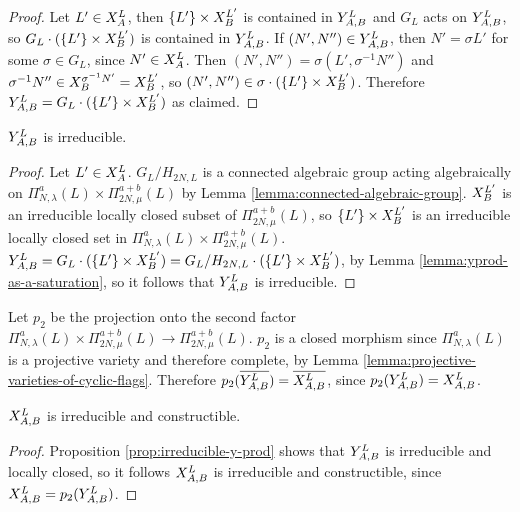 \documentclass[a4paper, 11pt, twoside]{report}
\begin{document}
\begin{proof}
Let $L'\in\xprod[L]{A}$, then $\{L'\}\times\xprod[L']{B}$ is contained in $\yprod[L]{A,B}$ and $G_L$ acts on $\yprod[L]{A,B}$, so $G_L\cdot(\{L'\}\times\xprod[L']{B})$ is contained in $\yprod[L]{A,B}$. If $(N',N'')\in\yprod[L]{A,B}$, then $N'=\sigma L'$ for some $\sigma\in G_L$, since $N'\in\xprod[L]{A}$. Then $(N',N'')=\sigma (L',\sigma^{-1}N'')$ and $\sigma^{-1}N''\in\xprod[\sigma^{-1}N']{B}=\xprod[L']{B}$, so $(N',N'')\in\sigma\cdot(\{L'\}\times\xprod[L']{B})$. Therefore $\yprod[L]{A,B}=G_L\cdot(\{L'\}\times\xprod[L']{B})$ as claimed.
\end{proof}

\begin{proposition}\label{prop:irreducible-y-prod}
$\yprod[L]{A,B}$ is irreducible.
\end{proposition}

\begin{proof}
Let $L'\in\xprod[L]{A}$. $G_L/{H_{2N,L}}$ is a connected algebraic group acting algebraically on $\Pi_{N,\lambda}^a(L)\times\Pi_{2N,\mu}^{a+b}(L)$ by Lemma \ref{lemma:connected-algebraic-group}. $\xprod[L']{B}$ is an irreducible locally closed subset of $\Pi_{2N,\mu}^{a+b}(L)$, so $\{L'\}\times\xprod[L']{B}$ is an irreducible locally closed set in $\Pi_{N,\lambda}^a(L)\times\Pi_{2N,\mu}^{a+b}(L)$. $\yprod[L]{A,B}=G_L\cdot (\{L'\}\times\xprod[L']{B}) = G_L/{H_{2N,L}}\cdot (\{L'\}\times\xprod[L']{B})$, by Lemma \ref{lemma:yprod-as-a-saturation}, so it follows that $\yprod[L]{A,B}$ is irreducible.
\end{proof}

Let $p_2$ be the projection onto the second factor $\Pi_{N,\lambda}^a(L)\times\Pi_{2N,\mu}^{a+b}(L)\to\Pi_{2N,\mu}^{a+b}(L)$. $p_2$ is a closed morphism since $\Pi_{N,\lambda}^a(L)$ is a projective variety and therefore complete, by Lemma \ref{lemma:projective-varieties-of-cyclic-flags}. Therefore $p_2(\overline{\yprod[L]{A,B}})=\overline{\xprod[L]{A,B}}$, since $p_2(\yprod[L]{A,B})=\xprod[L]{A,B}$.

\begin{lemma}\label{lemma:irreducible-x-prod}
$\xprod[L]{A,B}$ is irreducible and constructible.
\end{lemma}

\begin{proof}
Proposition \ref{prop:irreducible-y-prod} shows that $\yprod[L]{A,B}$ is irreducible and locally closed, so it follows $\xprod[L]{A,B}$ is irreducible and constructible, since $\xprod[L]{A,B}=p_2(\yprod[L]{A,B})$.
\end{proof}
\end{document}
